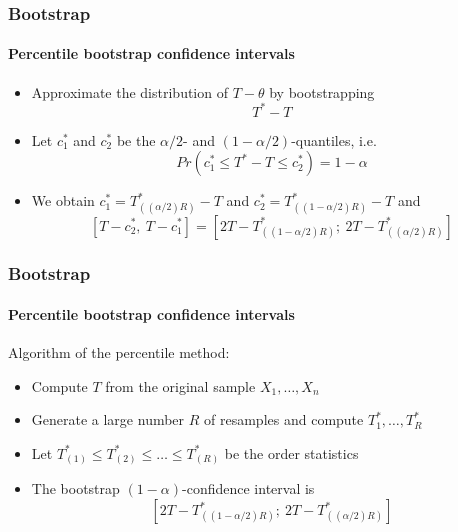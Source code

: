 \documentclass[smaller,compress]{beamer}
\begin{document}
\begin{frame}\frametitle{Bootstrap}\framesubtitle{Percentile bootstrap confidence intervals}
\begin{itemize}
    \item Approximate the distribution of $T-\theta $ by bootstrapping%
    \begin{equation*}
    T^{\ast }-T
    \end{equation*}
    \item Let $c_{1}^{\ast }$ and $c_{2}^{\ast }$ be the $\alpha /2$- and $\left( 1-\alpha /2\right) $-quantiles, i.e.
    \begin{equation*}
    Pr\left( c_{1}^{\ast }\leq T^{\ast }-T\leq c_{2}^{\ast}\right) =1-\alpha
    \end{equation*}
    \item We obtain $c_{1}^{\ast }=T_{((\alpha/2)R)}^{\ast }-T$ and $c_{2}^{\ast }=T_{((1-\alpha /2)R)}^{\ast }-T$ and
    \begin{equation*}
    \left[ T-c_{2}^{\ast },\ T-c_{1}^{\ast }\right] =\left[2T-T_{(\left( 1-\alpha /2\right) R)}^{\ast };\ 2T-T_{((\alpha/2)R)}^{\ast }\right]
    \end{equation*}
\end{itemize}
\end{frame}


\begin{frame}\frametitle{Bootstrap}\framesubtitle{Percentile bootstrap confidence intervals}
Algorithm of the percentile method:
\begin{itemize}
    \item Compute $T$ from the original sample $X_{1},\ldots ,X_{n}$
    \item Generate a large number $R$ of resamples and compute $T_{1}^{\ast },\ldots ,T_{R}^{\ast }$
    \item Let $T_{(1)}^{\ast }\leq T_{(2)}^{\ast }\leq\ldots \leq T_{(R)}^{\ast }$ be the order statistics
    \item The bootstrap $\left( 1-\alpha \right) $-confidence interval is
    \begin{equation*}
    \left[ 2T-T_{(\left( 1-\alpha /2\right) R)}^{\ast };\ 2 T-T_{((\alpha /2)R)}^{\ast }\right]
    \end{equation*}
\end{itemize}
\end{frame}
\end{document}
